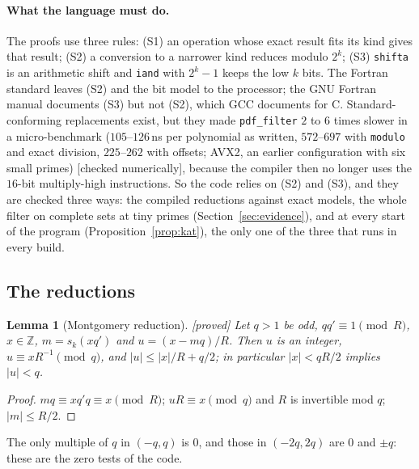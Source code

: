 \documentclass[10pt,a4paper]{article}
\newcommand{\Z}{\mathbb{Z}}
\newcommand{\code}[1]{\texttt{#1}}
\newcommand{\stproved}{\textsf{\small[proved]}\xspace}
\newcommand{\stnum}{\textsf{\small[checked numerically]}\xspace}
\theoremstyle{plain}
\newtheorem{lemma}[proposition]{Lemma}
\theoremstyle{definition}
\begin{document}
\paragraph{What the language must do.}  The proofs use three rules: (S1) an operation whose exact result fits its kind gives that result; (S2) a conversion to a
narrower kind reduces modulo $2^k$; (S3) \code{shifta} is an arithmetic shift and \code{iand} with $2^k-1$ keeps the low $k$ bits.  The Fortran standard leaves
(S2) and the bit model to the processor; the GNU Fortran manual documents (S3) but not (S2), which GCC documents for C.  Standard-conforming replacements exist,
but they made \code{pdf\_filter} $2$ to $6$ times slower in a micro-benchmark ($105$--$126$\,ns per polynomial as written, $572$--$697$ with \code{modulo} and exact
division, $225$--$262$ with offsets; AVX2, an earlier configuration with six small primes) \stnum, because the compiler then no longer uses the $16$-bit
multiply-high instructions.  So the code relies on (S2) and (S3), and they are checked three ways: the compiled reductions against exact models, the whole filter on
complete sets at tiny primes (Section~\ref{sec:evidence}), and at every start of the program (Proposition~\ref{prop:kat}), the only one of the three that runs in
every build.

\subsection{The reductions}

\begin{lemma}[Montgomery reduction]\label{lem:montgen}\stproved
Let $q>1$ be odd, $qq'\equiv1\pmod R$, $x\in\Z$, $m=s_k(xq')$ and $u=(x-mq)/R$.  Then $u$ is an integer, $u\equiv xR^{-1}\pmod q$, and $|u|\le|x|/R+q/2$; in
particular $|x|<qR/2$ implies $|u|<q$.
\end{lemma}
\begin{proof}
$mq\equiv xq'q\equiv x\pmod R$; $uR\equiv x\pmod q$ and $R$ is invertible mod $q$; $|m|\le R/2$.
\end{proof}

The only multiple of $q$ in $(-q,q)$ is $0$, and those in $(-2q,2q)$ are $0$ and $\pm q$: these are the zero tests of the code.
\end{document}
